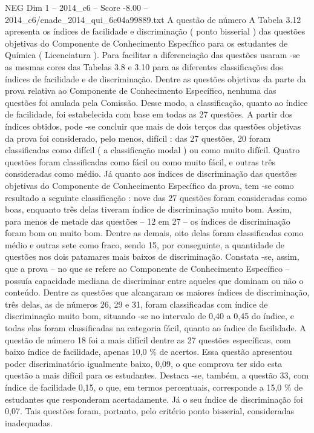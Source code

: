 \begin{textsample}{NEG Dim 1 – 2014\_c6 – Score -8.00 – 2014\_c6/enade\_2014\_qui\_6c04a99889.txt}
A questão de número A Tabela 3.12 apresenta os índices de facilidade e discriminação ( ponto bisserial ) das questões objetivas do Componente de Conhecimento Específico para os estudantes de Química ( Licenciatura ).
Para facilitar a diferenciação das questões usaram -se as mesmas cores das Tabelas 3.8 e 3.10 para as diferentes classificações dos índices de facilidade e de discriminação.
Dentre as questões objetivas da parte da prova relativa ao Componente de Conhecimento Específico, nenhuma das questões foi anulada pela Comissão.
Desse modo, a classificação, quanto ao índice de facilidade, foi estabelecida com base em todas as 27 questões.
A partir dos índices obtidos, pode -se concluir que mais de dois terços das questões objetivas da prova foi considerado, pelo menos, difícil : das 27 questões, 20 foram classificadas como difícil ( a classificação modal ) ou como muito difícil.
Quatro questões foram classificadas como fácil ou como muito fácil, e outras três consideradas como médio.
Já quanto aos índices de discriminação das questões objetivas do Componente de Conhecimento Específico da prova, tem -se como resultado a seguinte classificação : nove das 27 questões foram consideradas como boas, enquanto três delas tiveram índice de discriminação muito bom.
Assim, para menos de metade das questões – 12 em 27 – os índices de discriminação foram bom ou muito bom.
Dentre as demais, oito delas foram classificadas como médio e outras sete como fraco, sendo 15, por conseguinte, a quantidade de questões nos dois patamares mais baixos de discriminação.
Constata -se, assim, que a prova – no que se refere ao Componente de Conhecimento Específico – possuía capacidade mediana de discriminar entre aqueles que dominam ou não o conteúdo.
Dentre as questões que alcançaram os maiores índices de discriminação, três delas, as de números 26, 29 e 31, foram classificadas com índice de discriminação muito bom, situando -se no intervalo de 0,40 a 0,45 do índice, e todas elas foram classificadas na categoria fácil, quanto ao índice de facilidade.
A questão de número 18 foi a mais difícil dentre as 27 questões específicas, com baixo índice de facilidade, apenas 10,0 \% de acertos.
Essa questão apresentou poder discriminatório igualmente baixo, 0,09, o que comprova ter sido esta questão a mais difícil para os estudantes.
Destaca -se, também, a questão 33, com índice de facilidade 0,15, o que, em termos percentuais, corresponde a 15,0 \% de estudantes que responderam acertadamente.
Já o seu índice de discriminação foi 0,07.
Tais questões foram, portanto, pelo critério ponto bisserial, consideradas inadequadas.

\end{textsample}
